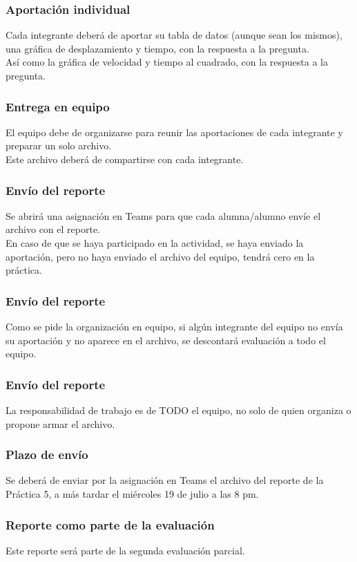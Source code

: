 \documentclass[14pt]{beamer}
\begin{document}
\begin{frame}
\frametitle{Aportación individual}
Cada integrante deberá de aportar su tabla de datos (aunque sean los mismos), una gráfica de desplazamiento y tiempo, con la respuesta a la pregunta.
\\
\bigskip
Así como la gráfica de velocidad y tiempo al cuadrado, con la respuesta a la pregunta.
\end{frame}
\begin{frame}
\frametitle{Entrega en equipo}
El equipo debe de organizarse para reunir las aportaciones de cada integrante y preparar un solo archivo.
\\
\bigskip
Este archivo deberá de compartirse con cada integrante.
\end{frame}
\begin{frame}
\frametitle{Envío del reporte}
Se abrirá una asignación en Teams para que cada alumna/alumno envíe el archivo con el reporte.
\\
\bigskip
En caso de que se haya participado en la actividad, se haya enviado la aportación, pero no haya enviado el archivo del equipo, tendrá cero en la práctica.
\end{frame}
\begin{frame}
\frametitle{Envío del reporte}
Como se pide la organización en equipo, si algún integrante del equipo no envía su aportación y no aparece en el archivo, se descontará evaluación a todo el equipo.
\end{frame}
\begin{frame}
\frametitle{Envío del reporte}
La responsabilidad de trabajo es de TODO el equipo, no solo de quien organiza o propone armar el archivo.
\end{frame}
\begin{frame}
\frametitle{Plazo de envío}
Se deberá de enviar por la asignación en Teams el archivo del reporte de la Práctica 5, a más tardar el miércoles 19 de julio a las 8 pm.
\end{frame}
\begin{frame}
\frametitle{Reporte como parte de la evaluación}
Este reporte será parte de la segunda evaluación parcial.
\end{frame}
\end{document}
